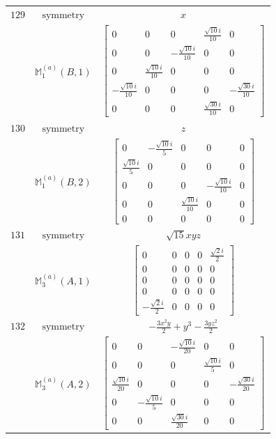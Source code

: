 \documentclass[fleqn,8pt,landscape]{jsarticle}
\begin{document}
\begin{longtable}{ccc}
$ 129 $ & $ \text{symmetry} $ & $ x $ \\
$  $ & $ \mathbb{M}_{1}^{(a)}(B,1) $ & $ \begin{bmatrix} 0 & 0 & 0 & \frac{\sqrt{10} i}{10} & 0 \\ 0 & 0 & - \frac{\sqrt{10} i}{10} & 0 & 0 \\ 0 & \frac{\sqrt{10} i}{10} & 0 & 0 & 0 \\ - \frac{\sqrt{10} i}{10} & 0 & 0 & 0 & - \frac{\sqrt{30} i}{10} \\ 0 & 0 & 0 & \frac{\sqrt{30} i}{10} & 0 \end{bmatrix} $ \\ \hline
$ 130 $ & $ \text{symmetry} $ & $ z $ \\
$  $ & $ \mathbb{M}_{1}^{(a)}(B,2) $ & $ \begin{bmatrix} 0 & - \frac{\sqrt{10} i}{5} & 0 & 0 & 0 \\ \frac{\sqrt{10} i}{5} & 0 & 0 & 0 & 0 \\ 0 & 0 & 0 & - \frac{\sqrt{10} i}{10} & 0 \\ 0 & 0 & \frac{\sqrt{10} i}{10} & 0 & 0 \\ 0 & 0 & 0 & 0 & 0 \end{bmatrix} $ \\ \hline
$ 131 $ & $ \text{symmetry} $ & $ \sqrt{15} x y z $ \\
$  $ & $ \mathbb{M}_{3}^{(a)}(A,1) $ & $ \begin{bmatrix} 0 & 0 & 0 & 0 & \frac{\sqrt{2} i}{2} \\ 0 & 0 & 0 & 0 & 0 \\ 0 & 0 & 0 & 0 & 0 \\ 0 & 0 & 0 & 0 & 0 \\ - \frac{\sqrt{2} i}{2} & 0 & 0 & 0 & 0 \end{bmatrix} $ \\ \hline
$ 132 $ & $ \text{symmetry} $ & $ - \frac{3 x^{2} y}{2} + y^{3} - \frac{3 y z^{2}}{2} $ \\
$  $ & $ \mathbb{M}_{3}^{(a)}(A,2) $ & $ \begin{bmatrix} 0 & 0 & - \frac{\sqrt{10} i}{20} & 0 & 0 \\ 0 & 0 & 0 & \frac{\sqrt{10} i}{5} & 0 \\ \frac{\sqrt{10} i}{20} & 0 & 0 & 0 & - \frac{\sqrt{30} i}{20} \\ 0 & - \frac{\sqrt{10} i}{5} & 0 & 0 & 0 \\ 0 & 0 & \frac{\sqrt{30} i}{20} & 0 & 0 \end{bmatrix} $ \\ \hline

\end{longtable}
\end{document}
